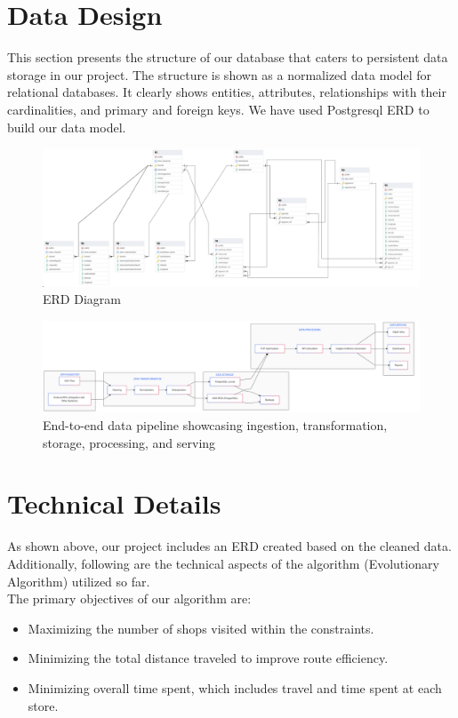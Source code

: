 \section{Data Design}

This section presents the structure of our database that caters to persistent data storage in our project. The structure is shown as a normalized data model for relational databases. It clearly shows entities, attributes, relationships with their cardinalities, and primary and foreign keys. We have used Postgresql ERD to build our data model.

\begin{figure}[H]
    \centering
\includegraphics[width=\textwidth]{images/erd.png} %
    \caption{ERD Diagram}
    \label{fig:UML-image}
\end{figure}
\begin{figure}[H]
    \centering
\includegraphics[width=1.1\textwidth]{images/DataPipeline (1).png} %
    \caption{End-to-end data pipeline showcasing ingestion, transformation, storage, processing, and serving}
    \label{fig:UML-image}
\end{figure}

 
\section{Technical Details}

As shown above, our project includes an ERD created based on the cleaned data. Additionally, following are the technical aspects of the algorithm (Evolutionary Algorithm) utilized so far.
\\
The primary objectives of our algorithm are:
\begin{itemize}
    \item Maximizing the number of shops visited within the constraints.
    \item Minimizing the total distance traveled to improve route efficiency.
    \item Minimizing overall time spent, which includes travel and time spent at each store.
\end{itemize}

